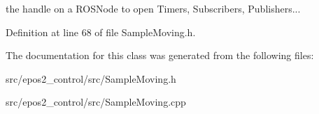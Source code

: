 the handle on a R\-O\-S\-Node to open Timers, Subscribers, Publishers... 



Definition at line 68 of file Sample\-Moving.\-h.



The documentation for this class was generated from the following files\-:\begin{DoxyCompactItemize}
\item 
src/epos2\-\_\-control/src/Sample\-Moving.\-h\item 
src/epos2\-\_\-control/src/Sample\-Moving.\-cpp\end{DoxyCompactItemize}
